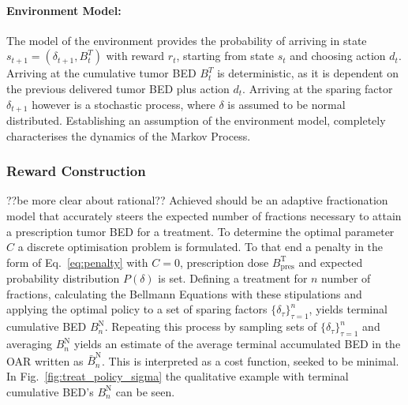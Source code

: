 \documentclass[\relativeRoot/ada.tex]{subfiles}
\begin{document}
\paragraph{Environment Model:} The model of the environment provides the probability of    arriving in state $s_{t+1} = (\delta_{t+1}, B^T_{t})$ with reward $r_t$, starting from state $s_t$ and choosing action $d_t$. Arriving at the cumulative tumor BED $B^T_{t}$ is deterministic, as it is dependent on the previous delivered tumor BED plus action $d_t$. Arriving at the sparing factor $\delta_{t+1}$ however is a stochastic process, where $\delta$ is assumed to be normal distributed. Establishing an assumption of the environment model, completely characterises the dynamics of the Markov Process.

\subsubsection{Reward Construction}
??be more clear about rational?? Achieved should be an adaptive fractionation model that accurately steers the expected number of fractions necessary to attain a prescription tumor BED for a treatment. To determine the optimal parameter $C$ a discrete optimisation problem is formulated. To that end a penalty in the form of Eq.~\eqref{eq:penalty} with $C=0$, prescription dose $B_{\text{pres}}^{\text{T}}$ and expected probability distribution $P(\delta)$ is set. Defining a treatment for $n$ number of fractions, calculating the Bellmann Equations with these stipulations and applying the optimal policy to a set of sparing factors $\{\delta_\tau\}_{\tau=1}^{n}$, yields terminal cumulative BED $B^{\text{N}}_n$. Repeating this process by sampling sets of $\{\delta_\tau\}_{\tau=1}^{n}$ and averaging $B^{\text{N}}_n$ yields an estimate of the average terminal accumulated BED in the OAR written as $\bar{B}^{\text{N}}_n$. This is interpreted as a cost function, seeked to be minimal. In Fig.~\ref{fig:treat_policy_sigma} the qualitative example with terminal cumulative BED's $B^{\text{N}}_n$ can be seen.
\end{document}
